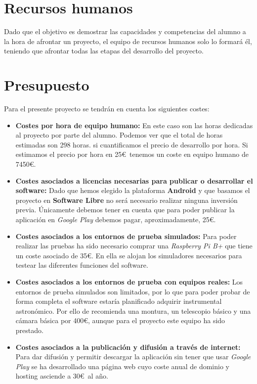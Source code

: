 \section{Recursos humanos}

Dado que el objetivo es demostrar las capacidades y competencias del alumno a la hora de afrontar un proyecto, el equipo de recursos humanos solo lo formará él, teniendo que afrontar todas las etapas del desarrollo del proyecto.
\newpage
\section{Presupuesto}

Para el presente proyecto se tendrán en cuenta los siguientes costes:

\begin{itemize}
  \item \textbf{Costes por hora de equipo humano:} En este caso son las horas dedicadas al proyecto por parte del alumno. Podemos ver que el total de horas estimadas son 298 horas. si cuantificamos el precio de desarrollo por hora. Si estimamos el precio por hora en 25\euro \ tenemos un coste en equipo humano de 7450\euro.
  \item \textbf{Costes asociados a licencias necesarias para publicar o desarrollar el software:} Dado que hemos elegido la plataforma \textbf{Android} y que basamos el proyecto en \textbf{Software Libre} no será necesario realizar ninguna inversión previa. Únicamente debemos tener en cuenta que para poder publicar la aplicación en \textit{Google Play} debemos pagar, aproximadamente, 25\euro.
  \item \textbf{Costes asociados a los entornos de prueba simulados:} Para poder realizar las pruebas ha sido necesario comprar una \textit{Raspberry Pi B+} que tiene un coste asociado de 35\euro. En ella se alojan los simuladores necesarios para testear las diferentes funciones del software.
  \item \textbf{Costes asociados a los entornos de prueba con equipos reales:} Los entornos de prueba simulados son limitados, por lo que para poder probar de forma completa el software estaría planificado adquirir instrumental astronómico. Por ello de recomienda una montura, un telescopio básico y una cámara básica por 400\euro , aunque para el proyecto este equipo ha sido prestado.
  \item \textbf{Costes asociados a la publicación y difusión a través de internet:} Para dar difusión y permitir descargar la aplicación sin tener que usar \textit{Google Play} se ha desarrollado una página web cuyo coste anual de dominio y hosting asciende a 30\euro \ al año.
\end{itemize}


